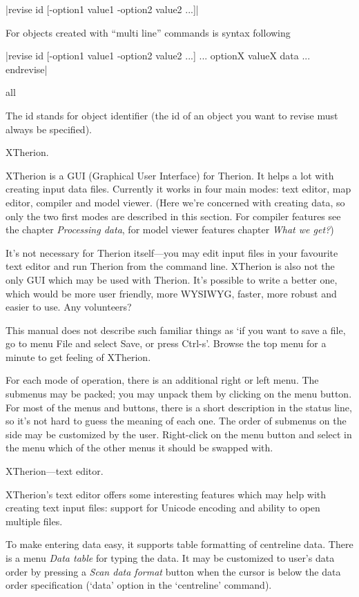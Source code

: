   |revise id [-option1 value1 -option2 value2 ...]|
  
  For objects created with ``multi line'' commands is syntax following

|revise id [-option1 value1 -option2 value2 ...]
  ...
  optionX valueX
  data
  ...
endrevise|
\endsyntax

\context
  all
\endcontext

\arguments
  The id stands for object identifier (the id of an object you want to
  revise must always be specified).
\endarguments



\subchapter XTherion.

XTherion is a GUI (Graphical User Interface) for Therion. 
It helps a lot with creating input data files. Currently it works in 
four main modes: text editor, map editor, compiler and model viewer. 
(Here we're concerned with creating data, so only the two first modes are 
described in this section. For compiler 
features see the chapter {\it Processing data}, for model viewer features 
chapter {\it What we get?})

It's not necessary for Therion itself---you may edit input files in your 
favourite text editor and run Therion from the command line. XTherion is also 
not the only GUI which may be used with Therion. It's possible to 
write a better one, which would be more user friendly, more WYSIWYG, faster, 
more robust and easier to use. Any volunteers?

This manual does not describe such familiar things as `if you want to save a file, go to 
menu File and select Save, or press Ctrl-s'. Browse the top menu for a minute 
to get feeling of XTherion. 

For each mode of operation, there is an additional 
right or left menu. The submenus may be packed; you may unpack them by 
clicking on the menu button. For most of the menus and buttons, there is a short 
description in the status line, so it's not hard to guess the meaning of each one.
The order of submenus on the side may be customized by the user. Right-click on 
the menu button and select in the menu which of the other menus it should 
be swapped with.


\subsubchapter XTherion---text editor.

XTherion's text editor offers some interesting features which may help with 
creating text input files: support for Unicode encoding and ability to open 
multiple files. 

To make entering data easy, it supports table formatting of centreline data. 
There is a menu {\it Data table} for typing the data. It may be customized to 
user's data order by pressing a {\it Scan data format} button when the cursor 
is below the data order specification (`data' option in the `centreline' 
command).


